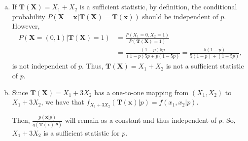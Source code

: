 \documentclass[letterpaper]{article}
\newcommand{\bx}{\mathbf{x}}
\newcommand{\bX}{\mathbf{X}}
\newcommand{\Tx}{\mathbf{T(x)}}
\newcommand{\TX}{\mathbf{T(X)}}
\begin{document}
        \section{}
        \begin{enumerate}[(a)]
        \item 
        If $\TX = X_1 + X_2$ is a sufficient statistic, by definition, the conditional probability $P(\bX = \bx|\TX = \Tx)$ should be independent of $p$. However,
        \begin{align*}
        P(\bX = (0, 1)|\TX = 1) & = \frac{P(X_1 = 0, X_2 = 1)}{P(\TX = 1)} \\
        & = \frac{(1-p)5p}{(1-p)5p + p(1-5p)} = \frac{5(1-p)}{5(1-p) + (1-5p)},
        \end{align*}
        is not independent of $p$. Thus, $\TX = X_1 + X_2$ is not a sufficient statistic of $p$.

        \item
        Since $\TX = X_1 + 3X_2$ has a one-to-one mapping from $(X_1, X_2)$ to $X_1 + 3X_2$, we have that $f_{X_1+3X_2}(\Tx|p) = f(x_1, x_2|p)$. 

        Then, $\frac{p(\bx|p)}{q(\Tx|\theta)}$ will remain as a constant and thus independent of $p$. So, $X_1 + 3X_2$ is a sufficient statistic for $p$.
        \end{enumerate}
\end{document}
